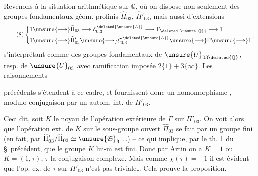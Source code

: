 Revenons à la situation arithmétique sur $\mathbb Q$, où on dispose non seulement des groupes fondamentaux géom. profinis $\widehat{\Pi}_{03}$, $\widehat{\Pi}'_{03}$, mais aussi d'extensions
\[
\tag{8}
\left\{\begin{aligned}
1&\unsure{\longrightarrow}\widehat{\Pi}_{03}\longrightarrow\mathcal E_{0,3}^{\deleted{\unsure{\wedge}}}\longrightarrow\Gamma_{\deleted{\unsure{\mathbb Q}}}\longrightarrow1\\
1&\unsure{\longrightarrow}\widehat{\Pi}'_{03}\unsure{\longrightarrow}\mathcal E_{0,3}^{\prime\deleted{\unsure{\wedge}}}\unsure{\longrightarrow}\Gamma\unsure{\longrightarrow}1
\end{aligned}\right.,
\]
s'interprétant comme des groupes fondamentaux de $\unsure{U}_{03\deleted{\mathbb Q}}$, resp. de $\unsure{U}_{03}$ avec ramification imposée $2\{1\}+3\{\infty\}$. Les raisonnements

précédents s'étendent à ce cadre, et fournissent donc un homomorphisme  
,
modulo conjugaison par un autom. int. de $\Pi'_{03}$.


Ceci dit, soit $K$ le noyau de l'opération extérieure de $\Gamma$ sur $\Pi'_{03}$. On voit alors que  l'opération ext. de $K$ sur le sous-groupe ouvert $\widehat{\Pi}_{03}$ se fait par un groupe fini (en fait, par  $\widehat{\Pi}'_{03}/\widehat{\Pi}_{03}\simeq\unsure{\mathfrak S}_3$ \ldots) -- ce qui implique, par le th. 1 du \S\ précédent, que le groupe $K$ lui-$\overline{\mathrm m}$ est fini. Donc par Artin on a $K=1$ ou $K=(1,\tau)$, $\tau$ la conjugaison complexe. Mais comme $\chi(\tau)=-1$ il est évident que l'op. ex. de $\tau$ sur $\Pi'_{03}$  n'est pas triviale\ldots
{}
 Cela prouve la proposition.

